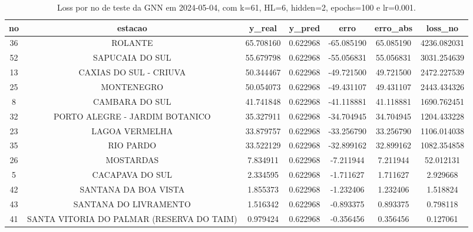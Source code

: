 \begin{table}[h]
\centering
\caption{Loss por no de teste da GNN em 2024-05-04, com k=61, HL=6, hidden=2, epochs=100 e lr=0.001.}
\label{tab:gnn_loss_k61_hl6_h2_e100_d20240504}
\begin{tabular}{ccccccc}
\toprule
no & estacao & y\_real & y\_pred & erro & erro\_abs & loss\_no \\
\midrule
36 & ROLANTE & 65.708160 & 0.622968 & -65.085190 & 65.085190 & 4236.082031 \\
52 & SAPUCAIA DO SUL & 55.679798 & 0.622968 & -55.056831 & 55.056831 & 3031.254639 \\
13 & CAXIAS DO SUL - CRIUVA & 50.344467 & 0.622968 & -49.721500 & 49.721500 & 2472.227539 \\
25 & MONTENEGRO & 50.054073 & 0.622968 & -49.431107 & 49.431107 & 2443.434326 \\
8 & CAMBARA DO SUL & 41.741848 & 0.622968 & -41.118881 & 41.118881 & 1690.762451 \\
32 & PORTO ALEGRE - JARDIM BOTANICO & 35.327911 & 0.622968 & -34.704945 & 34.704945 & 1204.433228 \\
23 & LAGOA VERMELHA & 33.879757 & 0.622968 & -33.256790 & 33.256790 & 1106.014038 \\
35 & RIO PARDO & 33.522129 & 0.622968 & -32.899162 & 32.899162 & 1082.354858 \\
26 & MOSTARDAS & 7.834911 & 0.622968 & -7.211944 & 7.211944 & 52.012131 \\
5 & CACAPAVA DO SUL & 2.334595 & 0.622968 & -1.711627 & 1.711627 & 2.929668 \\
42 & SANTANA DA BOA VISTA & 1.855373 & 0.622968 & -1.232406 & 1.232406 & 1.518824 \\
43 & SANTANA DO LIVRAMENTO & 1.516342 & 0.622968 & -0.893375 & 0.893375 & 0.798118 \\
41 & SANTA VITORIA DO PALMAR (RESERVA DO TAIM) & 0.979424 & 0.622968 & -0.356456 & 0.356456 & 0.127061 \\
\bottomrule
\end{tabular}
\end{table}
